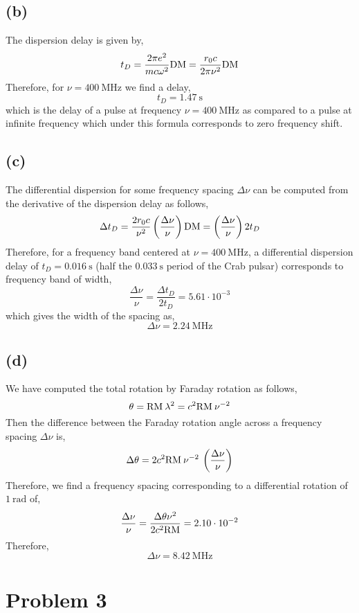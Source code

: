\documentclass[12pt]{article}
\begin{document}
\subsection*{(b)}

The dispersion delay is given by,
\[ t_D = \frac{2 \pi e^2}{m c \omega^2} \mathrm{DM} = \frac{r_0 c}{2 \pi \nu^2} \mathrm{DM} \]
Therefore, for $\nu = 400 \: \mathrm{MHz}$ we find a delay,
\[ t_D = 1.47 \: \mathrm{s} \]
which is the delay of a pulse at frequency $\nu = 400 \: \mathrm{MHz}$ as compared to a pulse at infinite frequency which under this formula corresponds to zero frequency shift. 

\subsection*{(c)}

The differential dispersion for some frequency spacing $\Delta \nu$ can be computed from the derivative of the dispersion delay as follows,
\[ \Delta t_{D} = \frac{2 r_0 c}{\nu^2} \left( \frac{\Delta \nu}{\nu} \right) \mathrm{DM} = \left( \frac{\Delta \nu}{\nu} \right) 2 t_D \]
Therefore, for a frequency band centered at $\nu = 400 \: \mathrm{MHz}$, a differential dispersion delay of $t_D = 0.016 \: \mathrm{s}$ (half the $0.033 \: \mathrm{s}$ period of the Crab pulsar) corresponds to frequency band of width,
\[ \frac{\Delta \nu}{\nu} = \frac{\Delta t_D}{2 t_D} = 5.61 \cdot 10^{-3} \]
which gives the width of the spacing as,
\[ \Delta \nu = 2.24 \: \mathrm{MHz} \]

\subsection*{(d)}

We have computed the total rotation by Faraday rotation as follows,
\[ \theta = \mathrm{RM} \: \lambda^2 = c^2 \mathrm{RM} \: \nu^{-2} \]
Then the difference between the Faraday rotation angle across a frequency spacing $\Delta \nu$ is,
\[ \Delta \theta = 2 c^2 \mathrm{RM} \: \nu^{-2} \: \left( \frac{\Delta \nu}{\nu} \right) \]
Therefore, we find a frequency spacing corresponding to a differential rotation of $1 \: \mathrm{rad}$ of,
\[ \frac{\Delta \nu}{\nu} = \frac{\Delta \theta \nu^2}{2 c^2 \mathrm{RM}} = 2.10 \cdot 10^{-2} \]
Therefore,
\[ \Delta \nu = 8.42 \: \mathrm{MHz} \]

\section{Problem 3}
\end{document}
